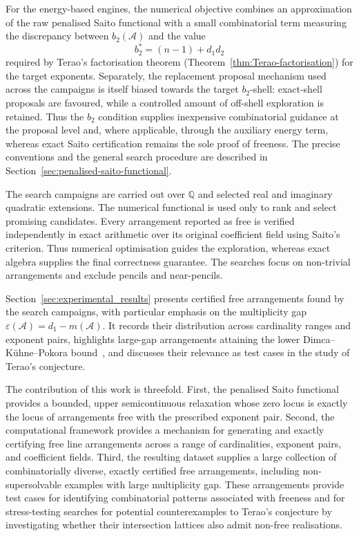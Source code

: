 \documentclass[pdflatex,sn-mathphys-num]{sn-jnl}%
\renewcommand{\epsilon}{\varepsilon}
\theoremstyle{remark}
\theoremstyle{definition}
\begin{document}
For the energy-based engines, the numerical objective combines an
approximation of the raw penalised Saito functional with a small combinatorial term measuring the discrepancy between $b_2(\mathcal{A})$ and the value
\[
b_2^*=(n-1)+d_1d_2
\]
required by Terao's factorisation theorem (Theorem~\ref{thm:Terao-factorisation}) for the target exponents. Separately, the replacement proposal mechanism used across the campaigns is itself biased towards the target $b_2$-shell: exact-shell proposals are favoured, while a controlled amount of off-shell exploration is retained. Thus the $b_2$ condition supplies inexpensive combinatorial guidance at the proposal level and, where applicable, through the auxiliary energy term, whereas exact Saito certification remains the sole proof of freeness. The precise conventions and the general search procedure are described in Section~\ref{sec:penalised-saito-functional}.

The search campaigns are carried out over $\mathbb{Q}$ and selected real and imaginary quadratic extensions. The numerical functional is used only to rank and select promising candidates. Every arrangement reported as free is verified independently in exact arithmetic over its original coefficient field using Saito's criterion. Thus numerical optimisation guides the exploration, whereas exact algebra supplies the final correctness guarantee. The searches focus on non-trivial arrangements and exclude pencils and near-pencils.

Section~\ref{sec:experimental_results} presents certified free arrangements found by the search campaigns, with particular emphasis on the multiplicity gap $\epsilon(\mathcal{A})=d_1-m(\mathcal{A})$. It records their distribution across cardinality ranges and exponent pairs, highlights large-gap arrangements attaining the lower Dimca--K\"uhne--Pokora bound~\cite{Dimca2026freelinearrangementslow}, and discusses their relevance as test cases in the study of Terao's conjecture.

The contribution of this work is threefold. First, the penalised Saito functional provides a bounded, upper semicontinuous relaxation whose zero locus is exactly the locus of arrangements free with the prescribed exponent pair. Second, the computational framework provides a mechanism for generating and exactly certifying free line arrangements across a range of cardinalities, exponent pairs, and coefficient fields. Third, the resulting dataset supplies a large collection of combinatorially diverse, exactly certified free arrangements, including non-supersolvable examples with large multiplicity gap. These arrangements provide test cases for identifying combinatorial patterns associated with freeness and for stress-testing searches for potential counterexamples to Terao's conjecture by investigating whether their intersection lattices also admit non-free realisations.
\end{document}
